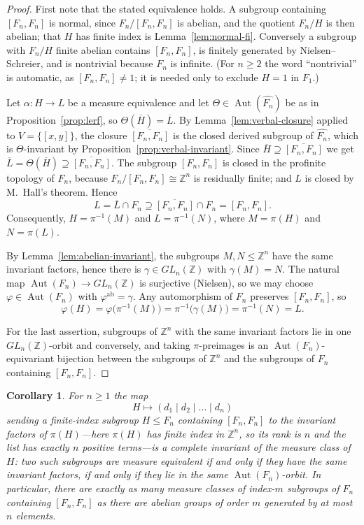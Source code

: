 \documentclass[11pt]{amsart}
\theoremstyle{plain}
\newtheorem{corollary}[theorem]{Corollary}
\theoremstyle{definition}
\newcommand{\Aut}{\operatorname{Aut}}
\begin{document}
\begin{proof}
First note that the stated equivalence holds.  A subgroup containing $[F_n,F_n]$
is normal, since $F_n/[F_n,F_n]$ is abelian, and the quotient $F_n/H$ is then
abelian; that $H$ has finite index is Lemma~\ref{lem:normal-fi}.  Conversely a
subgroup with $F_n/H$ finite
abelian contains $[F_n,F_n]$, is finitely generated by Nielsen--Schreier, and is
nontrivial because $F_n$ is infinite.  (For $n\ge2$ the word ``nontrivial'' is
automatic, as $[F_n,F_n]\neq1$; it is needed only to exclude $H=1$ in $F_1$.)

Let $\alpha\colon H\to L$ be a measure equivalence and let
$\Theta\in\Aut(\widehat{F_n})$ be as in Proposition~\ref{prop:lerf}, so
$\Theta(\overline H)=\overline L$.  By Lemma~\ref{lem:verbal-closure} applied to
$V=\{[x,y]\}$, the closure $\overline{[F_n,F_n]}$ is the closed derived subgroup
of $\widehat{F_n}$, which is $\Theta$-invariant by
Proposition~\ref{prop:verbal-invariant}.  Since
$\overline H\supseteq\overline{[F_n,F_n]}$ we get
$\overline L=\Theta(\overline H)\supseteq\overline{[F_n,F_n]}$.  The subgroup
$[F_n,F_n]$ is closed in the profinite topology of $F_n$, because
$F_n/[F_n,F_n]\cong\mathbb Z^{n}$ is residually finite; and $L$ is closed by
M.~Hall's theorem.  Hence
\[
  L=\overline L\cap F_n\supseteq\overline{[F_n,F_n]}\cap F_n=[F_n,F_n].
\]
Consequently, $H=\pi^{-1}(M)$ and $L=\pi^{-1}(N)$, where $M=\pi(H)$ and
$N=\pi(L)$.

By Lemma~\ref{lem:abelian-invariant}, the subgroups $M,N\le\mathbb Z^{n}$ have the
same invariant factors, hence there is $\gamma\in GL_n(\mathbb Z)$ with
$\gamma(M)=N$.  The natural map $\Aut(F_n)\to GL_n(\mathbb Z)$ is surjective
(Nielsen), so we may choose $\varphi\in\Aut(F_n)$ with
$\varphi^{\mathrm{ab}}=\gamma$.  Any automorphism of $F_n$ preserves
$[F_n,F_n]$, so
\[
  \varphi(H)=\varphi\bigl(\pi^{-1}(M)\bigr)=\pi^{-1}\bigl(\gamma(M)\bigr)
  =\pi^{-1}(N)=L .
\]

For the last assertion, subgroups of $\mathbb Z^{n}$ with the same invariant
factors lie in one $GL_n(\mathbb Z)$-orbit and conversely, and taking
$\pi$-preimages is an $\Aut(F_n)$-equivariant bijection between the subgroups of
$\mathbb Z^{n}$ and the subgroups of $F_n$ containing $[F_n,F_n]$.
\end{proof}

\begin{corollary}\label{cor:count}
For $n\ge1$ the map
\[
  H\longmapsto(d_1\mid d_2\mid\dots\mid d_n)
\]
sending a finite-index subgroup $H\le F_n$ containing $[F_n,F_n]$ to the
invariant factors of $\pi(H)$---here $\pi(H)$ has finite index in
$\mathbb Z^{n}$, so its rank is $n$ and the list has exactly $n$ positive
terms---is a complete invariant of the measure class of
$H$: two such subgroups are measure equivalent if and only if they have the same
invariant factors, if and only if they lie in the same $\Aut(F_n)$-orbit.  In
particular, there are exactly as many measure classes of index-$m$ subgroups of
$F_n$ containing $[F_n,F_n]$ as there are abelian groups of order $m$ generated
by at most $n$ elements.
\end{corollary}
\end{document}
